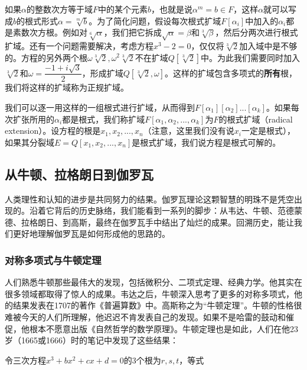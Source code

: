 \documentclass[b5paper]{ctexart}
\begin{document}
如果$\alpha$的整数次方等于域$F$中的某个元素$b$，也就是说$\alpha^m = b \in F$，这样$\alpha$就可以写成$b$的根式形式$\alpha = \sqrt[m]{b}$。为了简化问题，假设每次根式扩域$F[\alpha_i]$中加入的$\alpha_i$都是素数次方根。例如对$\sqrt[6]{\alpha}$，我们把它拆成$\sqrt{\alpha} = \beta$和$\sqrt[3]{\beta}$，然后分两次进行根式扩域。还有一个问题需要解决，考虑方程$x^3 - 2 = 0$，仅仅将$\sqrt[3]{2}$加入域中是不够的。方程的另外两个根$\omega\sqrt[3]{2}, \omega^2\sqrt[3]{2}$不在扩域$Q[\sqrt[3]{2}]$中。为此我们需要同时加入$\sqrt[3]{2}$和$\omega = \dfrac{-1 + i\sqrt{3}}{2}$，形成扩域$Q[\sqrt[3]{2}, \omega]$。这样的扩域包含多项式的\textbf{所有}根，我们将这样的扩域称为正规扩域。

我们可以逐一用这样的一组根式进行扩域，从而得到$F[\alpha_1][\alpha_2]...[\alpha_k]$。如果每次扩张所用的$\alpha_i$都是根式，我们称扩域$F[\alpha_1, \alpha_2, ..., \alpha_k]$为$F$的根式扩域（radical extension）。设方程的根是$x_1, x_2, ..., x_n$（注意，这里我们没有说$x_i$一定是根式），如果其分裂域$E = Q[x_1, x_2, ..., x_n]$是根式扩域，我们说方程是根式可解的。

\begin{Exercise}
\end{Exercise}

\subsection{从牛顿、拉格朗日到伽罗瓦}

人类理性和认知的进步是共同努力的结果。伽罗瓦理论这颗智慧的明珠不是凭空出现的。沿着它背后的历史脉络，我们能看到一系列的脚步：从韦达、牛顿、范德蒙德、拉格朗日、到高斯，最终在伽罗瓦手中结出了灿烂的成果。回溯历史，能让我们更好地理解伽罗瓦是如何形成他的思路的。

\subsubsection{对称多项式与牛顿定理}
人们熟悉牛顿那些最伟大的发现，包括微积分、二项式定理、经典力学。他其实在很多领域都取得了惊人的成果。韦达之后，牛顿深入思考了更多的对称多项式，他的结果发表在1707的著作《普遍算数》中。高斯称之为“牛顿定理”。牛顿的性格很难被今天的人们所理解，他迟迟不肯发表自己的发现。如果不是哈雷的鼓动和催促，他根本不愿意出版《自然哲学的数学原理》。牛顿定理也是如此，人们在他23岁（1665或1666）时的笔记中发现了这些结果：

令三次方程$x^3 + bx^2 + cx + d = 0$的3个根为$r, s, t$，等式
\end{document}
